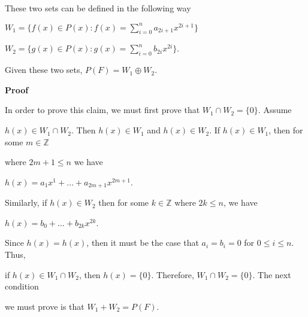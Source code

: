 \documentclass[12pt, a4paper]{article}
\begin{document}
\newpage

\par These two sets can be defined in the following way\par

\vspace{6mm}

\centerline{$W_1=\{f(x)\in P(x)\colon f(x)=\sum\limits_{i=0}^n a_{2i+1}x^{2i+1}\}$}\par

\vspace{4mm}

\centerline{$W_2=\{g(x)\in P(x)\colon g(x)=\sum\limits_{i=0}^n b_{2i}x^{2i}\}$.}

\vspace{4mm}

\par Given these two sets, $P(F)=W_1\oplus W_2$.

\vspace{4mm}

\par\textbf{Proof}\par

\vspace{2mm}

In order to prove this claim, we must first prove that $W_1\cap W_2=\{0\}$. Assume\par  $h(x)\in W_1\cap W_2$. Then $h(x)\in W_1$ and $h(x)\in W_2$. If $h(x)\in W_1$, then for some $m\in\mathbb{Z}$\par where $2m+1\leq n$ we have\par

\vspace{4mm}

\centerline{$h(x)=a_1x^1+\dots +a_{2m+1}x^{2m+1}$.}

\vspace{4mm}

\par Similarly, if $h(x)\in W_2$ then for some $k\in\mathbb{Z}$ where $2k\leq n$, we have\par

\vspace{4mm}

\centerline{$h(x)=b_0+\dots +b_{2k}x^{2k}$.}

\vspace{4mm}

\par Since $h(x)=h(x)$, then it must be the case that $a_i=b_i=0$ for $0\leq i\leq n$. Thus,\par if $h(x)\in W_1\cap W_2$, then $h(x)=\{0\}$. Therefore, $W_1\cap W_2=\{0\}$. The next condition\par we must prove is that $W_1+W_2=P(F)$.\par
\end{document}
